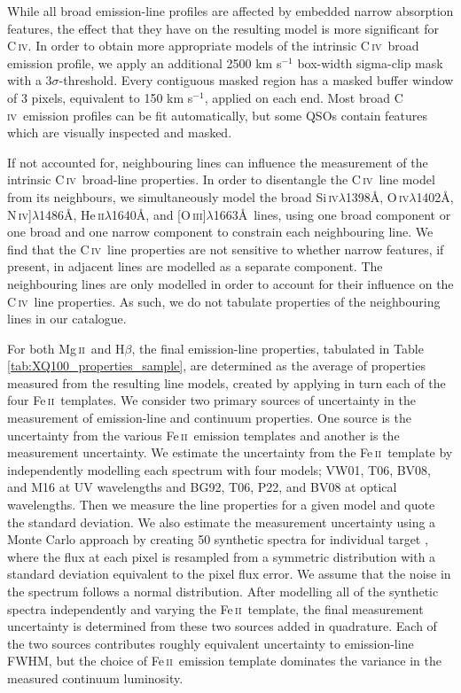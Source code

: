 \documentclass[fleqn,usenatbib]{mnras}
\newcommand{\mgii}{Mg\,\textsc{ii}}
\newcommand{\civ}{C\,\textsc{iv}}
\newcommand{\feii}{Fe\,\textsc{ii}}
\newcommand{\hbeta}{H\textsc{$\beta$}}
\newcommand{\nivl}{N\,\textsc{iv}]$\lambda$1486}
\newcommand{\siivl}{Si\,\textsc{iv}$\lambda$1398}
\newcommand{\oivl}{O\,\textsc{iv}$\lambda$1402}
\newcommand{\heiil}{He\,\textsc{ii}$\lambda$1640}
\newcommand{\oiiil}{[O\,\textsc{iii}]$\lambda$1663}
\begin{document}
While all broad emission-line profiles are affected by embedded narrow absorption features, the effect that they have on the resulting model is more significant for \civ. In order to obtain more appropriate models of the intrinsic \civ\ broad emission profile, we apply an additional 2500 km s$^{-1}$ box-width sigma-clip mask with a 3$\sigma$-threshold. Every contiguous masked region has a masked buffer window of 3 pixels, equivalent to 150 km s$^{-1}$, applied on each end. Most broad \civ\ emission profiles can be fit automatically, but some QSOs contain features which are visually inspected and masked. 

If not accounted for, neighbouring lines can influence the measurement of the intrinsic \civ\ broad-line properties. In order to disentangle the \civ\ line model from its neighbours, we simultaneously model the broad \siivl\AA, \oivl\AA, \nivl\AA, \heiil\AA, and \oiiil\AA\ lines, using one broad component or one broad and one narrow component to constrain each neighbouring line. We find that the \civ\ line properties are not sensitive to whether narrow features, if present, in adjacent lines are modelled as a separate component. The neighbouring lines are only modelled in order to account for their influence on the \civ\ line properties. As such, we do not tabulate properties of the neighbouring lines in our catalogue.

For both \mgii\ and \hbeta, the final emission-line properties, tabulated in Table \ref{tab:XQ100_properties_sample}, are determined as the average of properties measured from the resulting line models, created by applying in turn each of the four \feii\ templates. We consider two primary sources of uncertainty in the measurement of emission-line and continuum properties. One source is the uncertainty from the various \feii\ emission templates and another is the measurement uncertainty. We estimate the uncertainty from the \feii\ template by independently modelling each spectrum with four models; VW01, T06, BV08, and M16 at UV wavelengths and BG92, T06, P22, and BV08 at optical wavelengths. Then we measure the line properties for a given model and quote the standard deviation. We also estimate the measurement uncertainty using a Monte Carlo approach by creating 50 synthetic spectra for individual target \citep[e.g.,][]{Shen_2011}, where the flux at each pixel is resampled from a symmetric distribution with a standard deviation equivalent to the pixel flux error. We assume that the noise in the spectrum follows a normal distribution. After modelling all of the synthetic spectra independently and varying the \feii\ template, the final measurement uncertainty is determined from these two sources added in quadrature. Each of the two sources contributes roughly equivalent uncertainty to emission-line FWHM, but the choice of \feii\ emission template dominates the variance in the measured continuum luminosity. 
\end{document}
